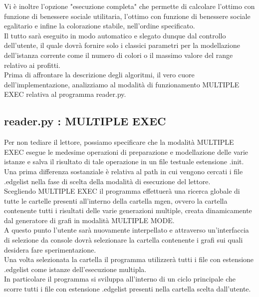 Vi è inoltre l'opzione "esecuzione completa" che permette di calcolare l'ottimo con funzione di benessere sociale utilitaria, l'ottimo con funzione di benessere sociale egalitario e infine la colorazione stabile, nell'ordine specificato.\\
Il tutto sarà eseguito in modo automatico e slegato dunque dal controllo dell'utente, il quale dovrà fornire solo i classici parametri per la modellazione dell'istanza corrente come il numero di colori o il massimo valore del range relativo ai profitti.\\

Prima di affrontare la descrizione degli algoritmi, il vero cuore dell'implementazione, analizziamo al modalità di funzionamento MULTIPLE EXEC relativa al programma reader.py.\\

\subsection{reader.py : MULTIPLE EXEC}
\justify
Per non tediare il lettore, possiamo specificare che la modalità MULTIPLE EXEC esegue le medesime operazioni di preparazione e modellazione delle varie istanze e salva il risultato di tale operazione in un file testuale estensione .init.\\

Una prima differenza sostanziale è relativa al path in cui vengono cercati i file .edgelist nella fase di scelta della modalità di esecuzione del lettore.\\
Scegliendo MULTIPLE EXEC il programma effettuerà una ricerca globale di tutte le cartelle presenti all'interno della cartella mgen, ovvero la cartella contenente tutti i risultati delle varie generazioni multiple, creata dinamicamente dal generatore di grafi in modalità MULTIPLE MODE.\\

A questo punto l'utente sarà nuovamente interpellato e attraverso un'interfaccia di selezione da console dovrà selezionare la cartella contenente i grafi sui quali desidera fare sperimentazione.\\
Una volta selezionata la cartella il programma utilizzerà tutti i file con estensione .edgelist come istanze dell'esecuzione multipla.\\
In particolare il programma si sviluppa all'interno di un ciclo principale che scorre tutti i file con estensione .edgelist presenti nella cartella scelta dall'utente.\\

